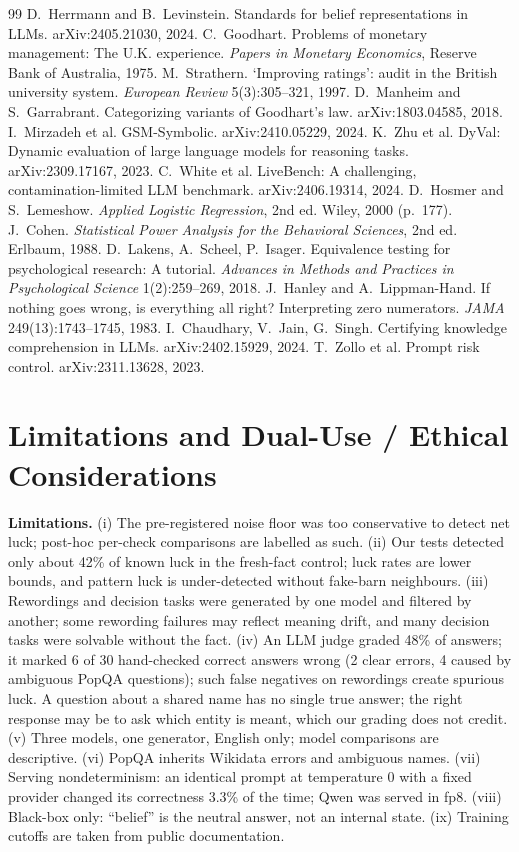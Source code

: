 \documentclass[10pt]{article}
\begin{document}
{\begin{thebibliography}{99}
 D.~Herrmann and B.~Levinstein. Standards for belief representations in LLMs. arXiv:2405.21030, 2024.
 C.~Goodhart. Problems of monetary management: The U.K. experience. \textit{Papers in Monetary Economics}, Reserve Bank of Australia, 1975.
 M.~Strathern. `Improving ratings': audit in the British university system. \textit{European Review} 5(3):305--321, 1997.
 D.~Manheim and S.~Garrabrant. Categorizing variants of Goodhart's law. arXiv:1803.04585, 2018.
 I.~Mirzadeh et al. GSM-Symbolic. arXiv:2410.05229, 2024.
 K.~Zhu et al. DyVal: Dynamic evaluation of large language models for reasoning tasks. arXiv:2309.17167, 2023.
 C.~White et al. LiveBench: A challenging, contamination-limited LLM benchmark. arXiv:2406.19314, 2024.
 D.~Hosmer and S.~Lemeshow. \textit{Applied Logistic Regression}, 2nd ed. Wiley, 2000 (p.~177).
 J.~Cohen. \textit{Statistical Power Analysis for the Behavioral Sciences}, 2nd ed. Erlbaum, 1988.
 D.~Lakens, A.~Scheel, P.~Isager. Equivalence testing for psychological research: A tutorial. \textit{Advances in Methods and Practices in Psychological Science} 1(2):259--269, 2018.
 J.~Hanley and A.~Lippman-Hand. If nothing goes wrong, is everything all right? Interpreting zero numerators. \textit{JAMA} 249(13):1743--1745, 1983.
 I.~Chaudhary, V.~Jain, G.~Singh. Certifying knowledge comprehension in LLMs. arXiv:2402.15929, 2024.
 T.~Zollo et al. Prompt risk control. arXiv:2311.13628, 2023.
\end{thebibliography}}

\appendix
\section{Limitations and Dual-Use / Ethical Considerations}
\textbf{Limitations.} (i) The pre-registered noise floor was too conservative to detect net luck; post-hoc per-check comparisons are labelled as such. (ii) Our tests detected only about 42\% of known luck in the fresh-fact control; luck rates are lower bounds, and pattern luck is under-detected without fake-barn neighbours. (iii) Rewordings and decision tasks were generated by one model and filtered by another; some rewording failures may reflect meaning drift, and many decision tasks were solvable without the fact. (iv) An LLM judge graded 48\% of answers; it marked 6 of 30 hand-checked correct answers wrong (2 clear errors, 4 caused by ambiguous PopQA questions); such false negatives on rewordings create spurious luck. A question about a shared name has no single true answer; the right response may be to ask which entity is meant, which our grading does not credit. (v) Three models, one generator, English only; model comparisons are descriptive. (vi) PopQA inherits Wikidata errors and ambiguous names. (vii) Serving nondeterminism: an identical prompt at temperature 0 with a fixed provider changed its correctness 3.3\% of the time; Qwen was served in fp8. (viii) Black-box only: ``belief'' is the neutral answer, not an internal state. (ix) Training cutoffs are taken from public documentation.
\end{document}
